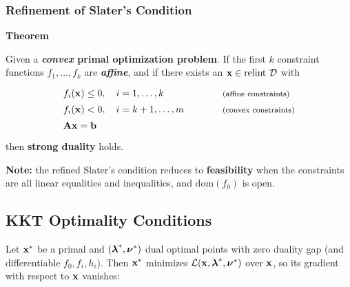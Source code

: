   \subsubsection{Refinement of Slater's Condition}

 \textbf{Theorem}

    Given a \textbf{\emph{convex} primal optimization problem}. If the first $k$ constraint functions $f_1, \ldots, f_k$ are \textbf{\emph{affine}}, and 
    if there exists an $\bm{\mathrm{x}} \in \text{relint}~\mathcal{D}$ with
    \begin{displaymath}
      \renewcommand\arraystretch{1.4}      
      \begin{array}{l l}
        f_i(\vect{x}) \le 0, \quad i=1,\dots,k                   & \text{\footnotesize (affine constraints)}\\
        f_i(\vect{x}) <   0, \quad i=k+1, \ldots, m \qquad \quad & \text{\footnotesize (convex constraints)}\\
        \mat{A}\vect{x} = \vect{b} & \\
      \end{array}
    \end{displaymath}
    then \textbf{strong duality} holds.
  
   \textbf{Note:} the refined Slater's condition reduces to \textbf{feasibility} when the constraints are all linear equalities and inequalities, and $\text{dom}(f_0)$ is open.  
 
\subsection{KKT Optimality Conditions}

  Let $\bm{\mathrm{x}}^*$ be a primal and $(\bm{\mathrm{\lambda}}^*, \bm{\mathrm{\nu}}^*)$ dual optimal points with zero duality gap (and differentiable $f_0,f_i,h_i$). Then $\bm{\mathrm{x}}^*$ minimizes $\mathcal L(\bm{\mathrm{x}}, \bm{\mathrm{\lambda}}^*, \bm{\mathrm{\nu}}^*)$ over $\bm{\mathrm{x}}$, so its gradient with respect to $\bm{\mathrm{x}}$ vanishes:
 
